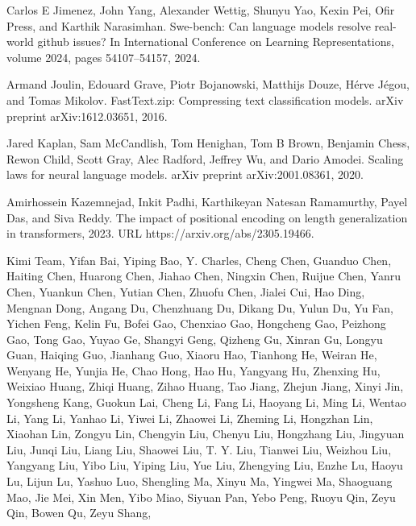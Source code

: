 \documentclass[
  10
]{article}
\begin{document}
Carlos E Jimenez, John Yang, Alexander Wettig, Shunyu Yao, Kexin Pei,
Ofir Press, and Karthik Narasimhan. Swe-bench: Can language models
resolve real-world github issues? In International Conference on
Learning Representations, volume 2024, pages 54107--54157, 2024.

Armand Joulin, Edouard Grave, Piotr Bojanowski, Matthijs Douze, Hérve
Jégou, and Tomas Mikolov. FastText.zip: Compressing text classification
models. arXiv preprint arXiv:1612.03651, 2016.

Jared Kaplan, Sam McCandlish, Tom Henighan, Tom B Brown, Benjamin Chess,
Rewon Child, Scott Gray, Alec Radford, Jeffrey Wu, and Dario Amodei.
Scaling laws for neural language models. arXiv preprint
arXiv:2001.08361, 2020.

Amirhossein Kazemnejad, Inkit Padhi, Karthikeyan Natesan Ramamurthy,
Payel Das, and Siva Reddy. The impact of positional encoding on length
generalization in transformers, 2023. URL https://arxiv.org/abs/2305.19466.

Kimi Team, Yifan Bai, Yiping Bao, Y. Charles, Cheng Chen, Guanduo Chen,
Haiting Chen, Huarong Chen, Jiahao Chen, Ningxin Chen, Ruijue Chen,
Yanru Chen, Yuankun Chen, Yutian Chen, Zhuofu Chen, Jialei Cui, Hao
Ding, Mengnan Dong, Angang Du, Chenzhuang Du, Dikang Du, Yulun Du, Yu
Fan, Yichen Feng, Kelin Fu, Bofei Gao, Chenxiao Gao, Hongcheng Gao,
Peizhong Gao, Tong Gao, Yuyao Ge, Shangyi Geng, Qizheng Gu, Xinran Gu,
Longyu Guan, Haiqing Guo, Jianhang Guo, Xiaoru Hao, Tianhong He, Weiran
He, Wenyang He, Yunjia He, Chao Hong, Hao Hu, Yangyang Hu, Zhenxing Hu,
Weixiao Huang, Zhiqi Huang, Zihao Huang, Tao Jiang, Zhejun Jiang, Xinyi
Jin, Yongsheng Kang, Guokun Lai, Cheng Li, Fang Li, Haoyang Li, Ming Li,
Wentao Li, Yang Li, Yanhao Li, Yiwei Li, Zhaowei Li, Zheming Li,
Hongzhan Lin, Xiaohan Lin, Zongyu Lin, Chengyin Liu, Chenyu Liu,
Hongzhang Liu, Jingyuan Liu, Junqi Liu, Liang Liu, Shaowei Liu, T. Y.
Liu, Tianwei Liu, Weizhou Liu, Yangyang Liu, Yibo Liu, Yiping Liu, Yue
Liu, Zhengying Liu, Enzhe Lu, Haoyu Lu, Lijun Lu, Yashuo Luo, Shengling
Ma, Xinyu Ma, Yingwei Ma, Shaoguang Mao, Jie Mei, Xin Men, Yibo Miao,
Siyuan Pan, Yebo Peng, Ruoyu Qin, Zeyu Qin, Bowen Qu, Zeyu Shang,
\end{document}
